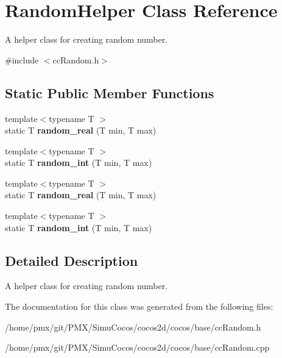 \hypertarget{classRandomHelper}{}\section{Random\+Helper Class Reference}
\label{classRandomHelper}


A helper class for creating random number.  




{\ttfamily \#include $<$cc\+Random.\+h$>$}

\subsection*{Static Public Member Functions}
\begin{DoxyCompactItemize}
\item 
\mbox{\label{classRandomHelper_add954a1af7de286173017b053d00a86f}} 
{\footnotesize template$<$typename T $>$ }\\static T {\bfseries random\+\_\+real} (T min, T max)
\item 
\mbox{\label{classRandomHelper_a987787d3d13aff80176cf1fd6ecee86b}} 
{\footnotesize template$<$typename T $>$ }\\static T {\bfseries random\+\_\+int} (T min, T max)
\item 
\mbox{\label{classRandomHelper_add954a1af7de286173017b053d00a86f}} 
{\footnotesize template$<$typename T $>$ }\\static T {\bfseries random\+\_\+real} (T min, T max)
\item 
\mbox{\label{classRandomHelper_a987787d3d13aff80176cf1fd6ecee86b}} 
{\footnotesize template$<$typename T $>$ }\\static T {\bfseries random\+\_\+int} (T min, T max)
\end{DoxyCompactItemize}


\subsection{Detailed Description}
A helper class for creating random number. 

The documentation for this class was generated from the following files\+:\begin{DoxyCompactItemize}
\item 
/home/pmx/git/\+P\+M\+X/\+Simu\+Cocos/cocos2d/cocos/base/cc\+Random.\+h\item 
/home/pmx/git/\+P\+M\+X/\+Simu\+Cocos/cocos2d/cocos/base/cc\+Random.\+cpp\end{DoxyCompactItemize}
